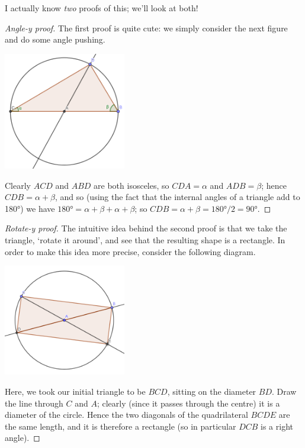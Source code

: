 I actually know \emph{two} proofs of this; we'll look at both!

\begin{proof}[Angle-y proof]
  The first proof is quite cute: we simply consider the next figure and do some angle pushing.
  \begin{center}
    \includegraphics[width=0.4\textwidth]{thales2}
  \end{center}
  Clearly $ ACD $ and $ ABD $ are both isosceles, so $ CDA = \alpha $ and $ ADB = \beta $; hence $ CDB = \alpha + \beta $,
  and so (using the fact that the internal angles of a triangle add to \ang{180}) we have $ \ang{180} = \alpha + \beta + \alpha + \beta $;
  so $ CDB = \alpha + \beta = \ang{180}/2 = \ang{90} $.
\end{proof}

\begin{proof}[Rotate-y proof]
  The intuitive idea behind the second proof is that we take the triangle, `rotate it around', and see that the resulting shape is a rectangle.
  In order to make this idea more precise, consider the following diagram.
  \begin{center}
    \includegraphics[width=0.4\textwidth]{thalesrotate}
  \end{center}
  Here, we took our initial triangle to be $ BCD $, sitting on the diameter $ BD $. Draw the line through $ C $ and $ A $; clearly (since it
  passes through the centre) it is a diameter of the circle. Hence the two diagonals of the quadrilateral $ BCDE $ are the same length,
  and it is therefore a rectangle (so in particular $ DCB $ is a right angle).
\end{proof}


